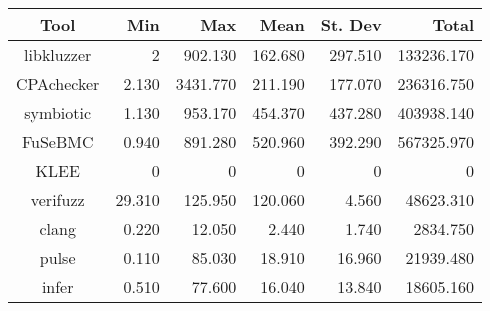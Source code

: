 \begin{table}
	\begin{center}
		\begin{tabular}{|c|r|r|r|r|r|}
			\hline
			Tool & Min & Max & Mean & St. Dev & Total \\
			\hline
			libkluzzer & 2 & 902.130 & 162.680 & 297.510 & 133236.170 \\
			\hline
			CPAchecker & 2.130 & 3431.770 & 211.190 & 177.070 & 236316.750 \\
			\hline
			symbiotic & 1.130 & 953.170 & 454.370 & 437.280 & 403938.140 \\
			\hline
			FuSeBMC & 0.940 & 891.280 & 520.960 & 392.290 & 567325.970 \\
			\hline
			KLEE & 0 & 0 & 0 & 0 & 0 \\
			\hline
			verifuzz & 29.310 & 125.950 & 120.060 & 4.560 & 48623.310 \\
			\hline
			clang & 0.220 & 12.050 & 2.440 & 1.740 & 2834.750 \\
			\hline
			pulse & 0.110 & 85.030 & 18.910 & 16.960 & 21939.480 \\
			\hline
			infer & 0.510 & 77.600 & 16.040 & 13.840 & 18605.160 \\
			\hline
		\end{tabular}
	\end{center}
\end{table}